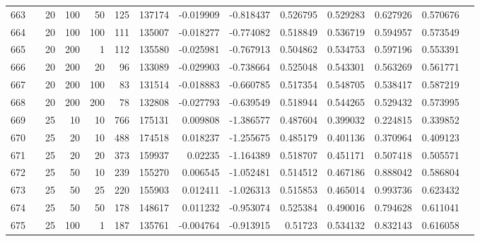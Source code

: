 \begin{longtable}{llrrrrrrrrrrrr}
		663 & &           20 &               100 &           50 &         125 &     137174 & -0.019909 & -0.818437 &  0.526795 &    0.529283 &       0.627926 &  0.570676 \\
		664 & &           20 &               100 &          100 &         111 &     135007 & -0.018277 & -0.774082 &  0.518849 &    0.536719 &       0.594957 &  0.573549 \\
		665 & &           20 &               200 &            1 &         112 &     135580 & -0.025981 & -0.767913 &  0.504862 &    0.534753 &       0.597196 &  0.553391 \\
		666 & &           20 &               200 &           20 &          96 &     133089 & -0.029903 & -0.738664 &  0.525048 &    0.543301 &       0.563269 &  0.561771 \\
		667 & &           20 &               200 &          100 &          83 &     131514 & -0.018883 & -0.660785 &  0.517354 &    0.548705 &       0.538417 &  0.587219 \\
		668 & &           20 &               200 &          200 &          78 &     132808 & -0.027793 & -0.639549 &  0.518944 &    0.544265 &       0.529432 &  0.573995 \\
		669 & &           25 &                10 &           10 &         766 &     175131 &  0.009808 & -1.386577 &  0.487604 &    0.399032 &       0.224815 &  0.339852 \\
		670 & &           25 &                20 &           10 &         488 &     174518 &  0.018237 & -1.255675 &  0.485179 &    0.401136 &       0.370964 &  0.409123 \\
		671 & &           25 &                20 &           20 &         373 &     159937 &   0.02235 & -1.164389 &  0.518707 &    0.451171 &       0.507418 &  0.505571 \\
		672 & &           25 &                50 &           10 &         239 &     155270 &  0.006545 & -1.052481 &  0.514512 &    0.467186 &       0.888042 &  0.586804 \\
		673 & &           25 &                50 &           25 &         220 &     155903 &  0.012411 & -1.026313 &  0.515853 &    0.465014 &       0.993736 &  0.623432 \\
		674 & &           25 &                50 &           50 &         178 &     148617 &  0.011232 & -0.953074 &  0.525384 &    0.490016 &       0.794628 &  0.611041 \\
		675 & &           25 &               100 &            1 &         187 &     135761 & -0.004764 & -0.913915 &   0.51723 &    0.534132 &       0.832143 &  0.616058 \\

\end{longtable}
